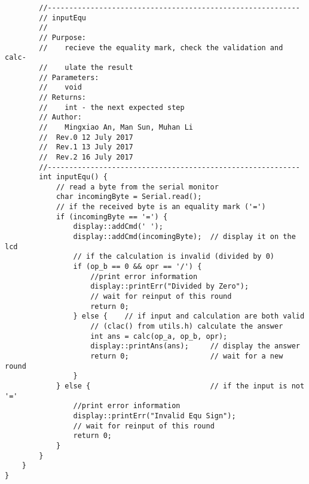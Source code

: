\begin{verbatim}
        //-----------------------------------------------------------  
        // inputEqu 
        //  
        // Purpose:  
        //    recieve the equality mark, check the validation and calc-
        //    ulate the result
        // Parameters:  
        //    void 
        // Returns:  
        //    int - the next expected step   
        // Author:  
        //    Mingxiao An, Man Sun, Muhan Li
        //  Rev.0 12 July 2017
        //  Rev.1 13 July 2017
        //  Rev.2 16 July 2017
        //----------------------------------------------------------- 
        int inputEqu() {
            // read a byte from the serial monitor
            char incomingByte = Serial.read();
            // if the received byte is an equality mark ('=')
            if (incomingByte == '=') {
                display::addCmd(' ');
                display::addCmd(incomingByte);  // display it on the lcd
                // if the calculation is invalid (divided by 0)
                if (op_b == 0 && opr == '/') {
                    //print error information
                    display::printErr("Divided by Zero");
                    // wait for reinput of this round
                    return 0;
                } else {    // if input and calculation are both valid
                    // (clac() from utils.h) calculate the answer
                    int ans = calc(op_a, op_b, opr);
                    display::printAns(ans);     // display the answer
                    return 0;                   // wait for a new round
                }
            } else {                            // if the input is not '='
                //print error information
                display::printErr("Invalid Equ Sign");
                // wait for reinput of this round
                return 0;
            }
        }
    }
}

\end{verbatim}

